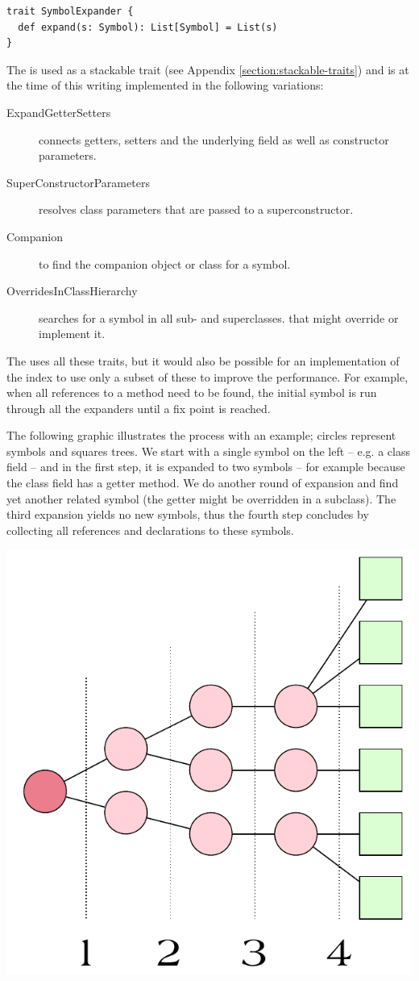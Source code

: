 \begin{lstlisting}
trait SymbolExpander {
  def expand(s: Symbol): List[Symbol] = List(s)
}
\end{lstlisting}

The  is used as a stackable trait (see Appendix \vref{section:stackable-traits}) and is at the time of this writing implemented in the following variations:

\begin{description}
 \item[ExpandGetterSetters] connects getters, setters and the underlying field as well as constructor parameters.
 \item[SuperConstructorParameters] resolves class parameters that are passed to a superconstructor.
 \item[Companion] to find the companion object or class for a symbol.
 \item[OverridesInClassHierarchy] searches for a symbol in all sub- and superclasses. that might override or implement it.
\end{description}

The  uses all these traits, but it would also be possible for an implementation of the index to use only a subset of these to improve the performance. For example, when all references to a method need to be found, the initial symbol is run through all the expanders until a fix point is reached.

The following graphic illustrates the process with an example; circles represent symbols and squares trees. We start with a single symbol on the left -- e.g. a class field -- and in the first step, it is expanded to two symbols -- for example because the class field has a getter method. We do another round of expansion and find yet another related symbol (the getter might be overridden in a subclass). The third expansion yields no new symbols, thus the fourth step concludes by collecting all references and declarations to these symbols.

\begin{center}
\includegraphics[width=0.5\linewidth]{expanding_symbols.pdf}
\end{center}

